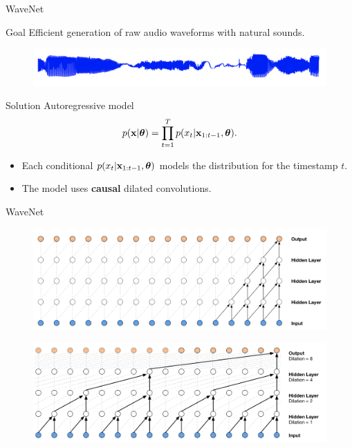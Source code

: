 \documentclass{beamer}
\begin{document}
\begin{frame}{WaveNet}
	\begin{block}{Goal}
		Efficient generation of raw audio waveforms with natural sounds.
	\end{block}
	\begin{figure}
	  \centering
	  \includegraphics[width=0.9\linewidth]{figs/wavenet_ex.png}
	\end{figure}
	\begin{block}{Solution}
		Autoregressive model
		\vspace{-0.3cm}
		\[
		    p(\mathbf{x}| \boldsymbol{\theta}) = \prod_{t=1}^T p(x_t|\mathbf{x}_{1:t-1}, \boldsymbol{\theta}).
		\]
		\vspace{-0.3cm}
	\end{block}
	\begin{itemize}
		\item Each conditional $p(x_t|\mathbf{x}_{1:t-1}, \boldsymbol{\theta})$ models the distribution for the timestamp $t$.
		\item The model uses \textbf{causal} dilated convolutions.
	\end{itemize}
\end{frame}
\begin{frame}{WaveNet}
	\begin{figure}
	    \centering
	    \includegraphics[width=0.9\linewidth]{figs/wavenet1.png}
	\end{figure}
	
	\begin{figure}
	    \centering
	    \includegraphics[width=0.9\linewidth]{figs/wavenet2.png}
	\end{figure}
\end{frame}
\end{document}
